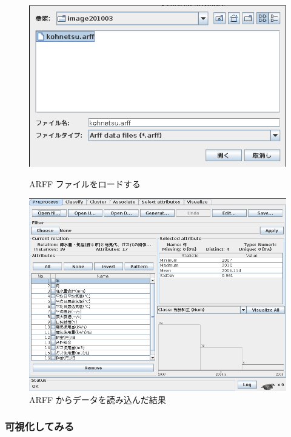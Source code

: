 \documentclass[mingoth,a4paper]{jsarticle}
\begin{document}
\begin{figure}[H]
 \begin{minipage}{0.5\hsize}
  \begin{center}
   \includegraphics[width=0.9\hsize]{image201003/weka2.png}
   \caption{ARFF ファイルをロードする}
   \label{fig:wekaarffload}
  \end{center}
 \end{minipage}
 \begin{minipage}{0.5\hsize}
  \begin{center}

   \includegraphics[width=0.9\hsize]{image201003/weka3.png}
   \caption{ARFF からデータを読み込んだ結果}
   \label{fig:wekaarffread}
  \end{center}
 \end{minipage}
\end{figure}

\subsubsection{可視化してみる}
\end{document}
